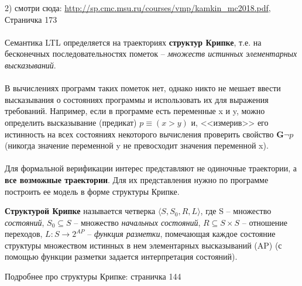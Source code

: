 
2) смотри сюда: \url{http://sp.cmc.msu.ru/courses/vmp/kamkin_mc2018.pdf}, 
Страничка 173

\paragraph{}
Семантика LTL определяется на траекториях \textbf{структур Крипке}, т.е. на бесконечных последовательностях пометок -- \textit{множеств истинных элементарных высказываний}.

\paragraph{}
В вычислениях программ таких пометок нет, однако никто не мешает ввести высказывания о состояниях программы и использовать их для выражения требований. 
Например, если в программе есть переменные x и y,
можно определить высказывание (предикат) $p \equiv (x > y)$ и, <<измерив>> его истинность на всех состояниях некоторого вычисления проверить свойство $\textbf{G} \neg p$ (никогда значение переменной y не превосходит значения переменной x).

\paragraph{}
Для формальной верификации интерес представляют не одиночные траектории, а \textbf{все возможные траектории}. 
Для их представления нужно по программе построить ее модель в форме структуры Крипке.

\textbf{Структурой Крипке} называется четверка $\langle S, S_0, R, L \rangle$, где S -- множество \textit{состояний}, $S_0 \subseteq S$ -- множество \textit{начальных состояний}, $R \subseteq S \times S$ -- отношение переходов, $L:S \rightarrow 2^{AP}$ -- \textit{функция разметки}, помечающая каждое состояние структуры множеством истинных в нем элементарных высказываний (AP) (с помощью функции разметки задается интерпретация состояний).

Подробнее про структуры Крипке: страничка 144

\paragraph{}

